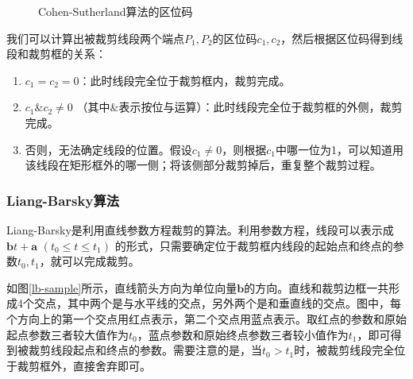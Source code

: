 \documentclass[a4paper,12pt]{article}
\begin{document}
\begin{figure}[htb]
\centering
{} %
\caption{Cohen-Sutherland算法的区位码} \label{ch-code}
\end{figure}

我们可以计算出被裁剪线段两个端点$P_1, P_2$的区位码$c_1, c_2$，然后根据区位码得到线段和裁剪框的关系：
\begin{enumerate}
	\item $c_1 = c_2 = 0$：此时线段完全位于裁剪框内，裁剪完成。
	\item $c_1 \& c_2 \neq 0$ （其中$\&$表示按位与运算）：此时线段完全位于裁剪框的外侧，裁剪完成。
	\item 否则，无法确定线段的位置。假设$c_1 \neq 0$，则根据$c_1$中哪一位为1，可以知道用该线段在矩形框外的哪一侧；将该侧部分裁剪掉后，重复整个裁剪过程。
\end{enumerate}

\subsubsection{Liang-Barsky算法}
Liang-Barsky\cite{wiki:LiangBarsky}是利用直线参数方程裁剪的算法。利用参数方程，线段可以表示成$\bm{b}t + \bm{a}$ $(t_0 \leq t \leq t_1)$ 的形式，只需要确定位于裁剪框内线段的起始点和终点的参数$t_0, t_1$，就可以完成裁剪。

如图\ref{lb-sample}所示，直线箭头方向为单位向量$\bm{b}$的方向。直线和裁剪边框一共形成4个交点，其中两个是与水平线的交点，另外两个是和垂直线的交点。图中，每个方向上的第一个交点用红点表示，第二个交点用蓝点表示。取红点的参数和原始起点参数三者较大值作为$t_0$，蓝点参数和原始终点参数三者较小值作为$t_1$，即可得到被裁剪线段起点和终点的参数。需要注意的是，当$t_0 > t_1$时，被裁剪线段完全位于裁剪框外，直接舍弃即可。
\end{document}
